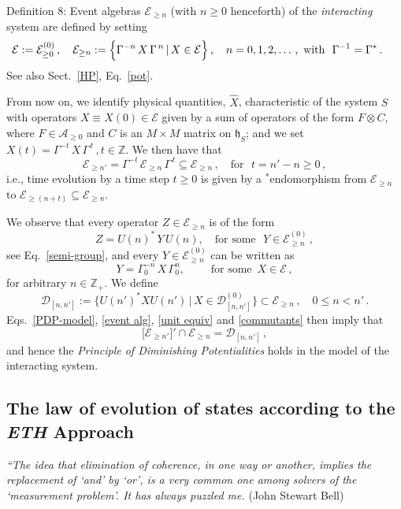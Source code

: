 \documentclass[12pt]{article}
\begin{document}
{Definition 8}:  Event algebras $\mathcal{E}_{\geq n}$ (with $n\geq 0$ henceforth) of the \textit{interacting} system are defined by setting
\begin{equation}\label{event alg}
\mathcal{E}:= \mathcal{E}_{\geq 0}^{(0)}\,, \quad \mathcal{E}_{\geq n} := \Big\{\Gamma^{-n}\, X\, \Gamma^{\,n}\, \vert\, X \in \mathcal{E} \Big\}\,,\quad n=0,1,2,\dots\,, \text{\,\,with\,\,\,\,}\Gamma^{-1}= \Gamma^{*}\,. \quad\,\, \square
\end{equation}
See also Sect.~\ref{HP}, Eq.~\eqref{pot}.

From now on, we identify physical quantities, $\hat{X}$, characteristic of the system $S$ with operators $X\equiv X(0) \in 
\mathcal{E}$ given by a sum of operators of the form $F\otimes C$, where $F\in \mathcal{A}_{\geq 0}$ and $C$ is 
an $M\times M$ matrix on $\mathfrak{h}_S$; and we set $X(t)= \Gamma^{-t}\,X\,\Gamma^{\,t}\,, t\in \mathbb{Z}.$ We then have that
$$\mathcal{E}_{\geq n'} = \Gamma^{-t}\, \mathcal{E}_{\geq n} \, \Gamma^{\,t} \subseteq \mathcal{E}_{\geq n}\,, \quad \text{for  }\,\, t= n'-n\geq 0\,,$$
i.e., time evolution by a time step $t\geq 0$ is given by a $^{*}$endomorphism from $\mathcal{E}_{\geq n}$ to 
$\mathcal{E}_{\geq (n+t)}\subseteq \mathcal{E}_{\geq n}$.

We observe that every operator $Z\in \mathcal{E}_{\geq n}$ is of the form
\begin{equation}\label{unit equiv}
Z= U(n)^{*}\, Y \,U(n),\quad \text{for some }\,\, Y\in \mathcal{E}_{\geq n}^{(0)}\,, 
\end{equation}
see Eq.~\eqref{semi-group}, and every $Y\in \mathcal{E}_{\geq n}^{(0)}$ can be written as
\begin{equation}\label{conjugation}
Y= \Gamma_{0}^{-n}\,X\,\Gamma_{0}^{n}, \qquad \text{  for some  }\, X\in \mathcal{E}\,,
\end{equation}
for arbitrary $n\in \mathbb{Z}_{+}$. We define 
\begin{equation}\label{commutants}
\mathcal{D}_{[n,n']}:= \big\{U(n')^{*} X U(n')\,\vert\, X \in \mathcal{D}_{[n,n']}^{(0)}\big\} \subset \mathcal{E}_{\geq n}\,, 
\quad 0\leq n<n'\,.
\end{equation}
Eqs.~\eqref{PDP-model}, \eqref{event alg}, \eqref{unit equiv} and \eqref{commutants} then imply that
$$\big[\mathcal{E}_{\geq n'}\big]' \cap \mathcal{E}_{\geq n} = \mathcal{D}_{[n,n']}\,,$$
and hence the \textit{Principle of Diminishing Potentialities} holds in the model of the interacting system.

\subsection{The law of evolution of states according to the \textit{ETH} Approach}
\hspace{0.5cm}\textit{``The idea that elimination of coherence, in one way or another, implies the replacement of `and' by `or', is a very common one among solvers of the `measurement problem'. It has always puzzled me.} (John Stewart Bell)\\
\end{document}
